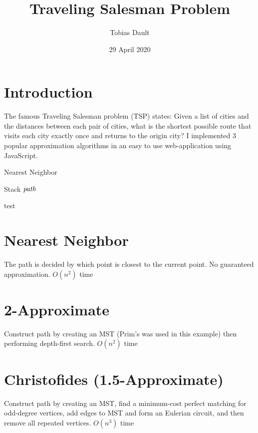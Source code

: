 \documentclass[11pt]{article}
\title{\textbf{Traveling Salesman Problem}}
\author{Tobias Dault}
\date{29 April 2020}
\begin{document}
\maketitle
\thispagestyle{empty}

\section{Introduction}
The famous Traveling Salesman problem (TSP) states: Given a list of cities and the distances between each pair of cities, what is the shortest possible route that visits each city exactly once and returns to the origin city? I implemented 3 popular approximation algorithms in an easy to use web-application using JavaScript.
\begin{algorithm}
	\caption{Nearest Neighbor}
	\begin{algorithmic}
		\State Stack $\emph{path}$
		
			\State test
		\EndWhile
	\end{algorithmic}
\end{algorithm}

\section{Nearest Neighbor}
The path is decided by which point is closest to the current point. No guaranteed approximation. $O(n^2)$ time



\section{2-Approximate}
Construct path by creating an MST (Prim's was used in this example) then performing depth-first search. $O(n^2)$ time

\section{Christofides (1.5-Approximate)}
Construct path by creating an MST, find a minimum-cost perfect matching for odd-degree vertices, add edges to MST and form an Eulerian circuit, and then remove all repeated vertices. $O(n^3)$ time
\end{document}
